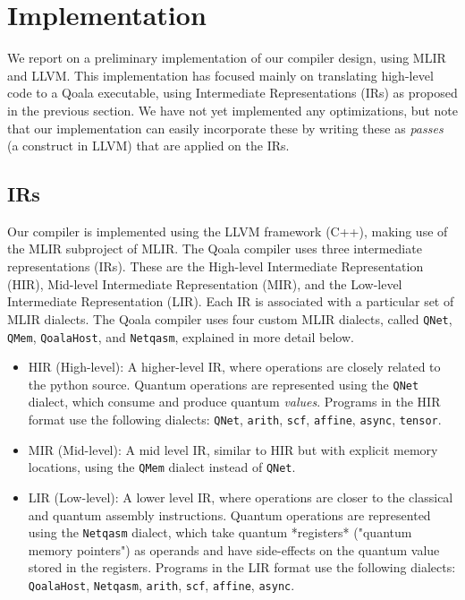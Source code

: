 \section{Implementation}

We report on a preliminary implementation of our compiler design, using MLIR and LLVM.
This implementation has focused mainly on translating high-level code to a Qoala executable, using Intermediate Representations (IRs) as proposed in the previous section.
We have not yet implemented any optimizations, but note that our implementation can easily incorporate these by writing these as \emph{passes} (a construct in LLVM) that are applied on the IRs.

\subsection{IRs}
Our compiler is implemented using the LLVM framework (C++), making use of the MLIR subproject of MLIR.
The Qoala compiler uses three intermediate representations (IRs).
These are the High-level Intermediate Representation (HIR), Mid-level Intermediate Representation (MIR), and the Low-level Intermediate Representation (LIR).
Each IR is associated with a particular set of MLIR dialects.
The Qoala compiler uses four custom MLIR dialects, called \texttt{QNet}, \texttt{QMem}, \texttt{QoalaHost}, and \texttt{Netqasm}, explained in more detail below.

\begin{itemize}
    \item HIR (High-level): A higher-level IR, where operations are closely related
    to the python source.
    Quantum operations are represented using the \texttt{QNet} dialect, which consume and produce quantum \emph{values}.
    Programs in the HIR format use the following dialects: \texttt{QNet}, \texttt{arith}, \texttt{scf}, \texttt{affine}, \texttt{async}, \texttt{tensor}.
    \item MIR (Mid-level): A mid level IR, similar to HIR but with explicit memory locations, using the \texttt{QMem} dialect instead of \texttt{QNet}.
    \item LIR (Low-level): A lower level IR, where operations are closer to the
    classical and quantum assembly instructions.
    Quantum operations are represented using the \texttt{Netqasm} dialect, which take quantum *registers* ("quantum memory pointers") as operands
    and have side-effects on the quantum value stored in the registers.
    Programs in the LIR format use the following dialects: \texttt{QoalaHost}, \texttt{Netqasm}, \texttt{arith}, \texttt{scf}, \texttt{affine}, \texttt{async}.
\end{itemize}


